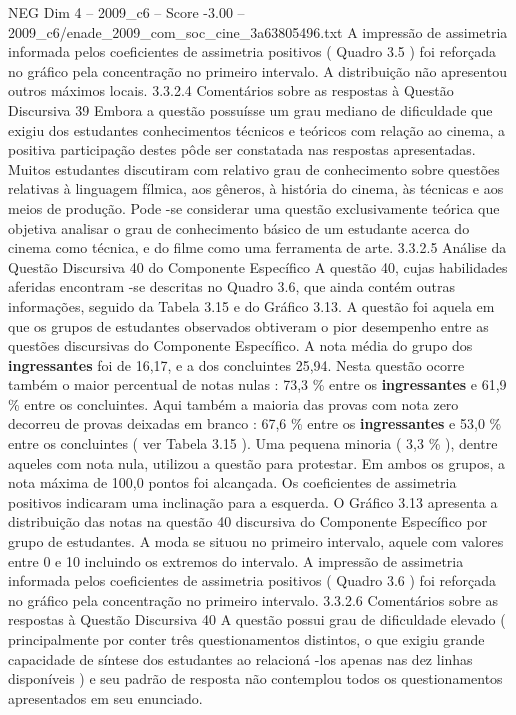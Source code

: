 \begin{textsample}{NEG Dim 4 – 2009\_c6 – Score -3.00 – 2009\_c6/enade\_2009\_com\_soc\_cine\_3a63805496.txt}
A impressão de assimetria informada pelos coeficientes de assimetria positivos ( Quadro 3.5 ) foi reforçada no gráfico pela concentração no primeiro intervalo.
A distribuição não apresentou outros máximos locais. 3.3.2.4 Comentários sobre as respostas à Questão Discursiva 39 Embora a questão possuísse um grau mediano de dificuldade que exigiu dos estudantes conhecimentos técnicos e teóricos com relação ao cinema, a positiva participação destes pôde ser constatada nas respostas apresentadas.
Muitos estudantes discutiram com relativo grau de conhecimento sobre questões relativas à linguagem fílmica, aos gêneros, à história do cinema, às técnicas e aos meios de produção.
Pode -se considerar uma questão exclusivamente teórica que objetiva analisar o grau de conhecimento básico de um estudante acerca do cinema como técnica, e do filme como uma ferramenta de arte. 3.3.2.5 Análise da Questão Discursiva 40 do Componente Específico A questão 40, cujas habilidades aferidas encontram -se descritas no Quadro 3.6, que ainda contém outras informações, seguido da Tabela 3.15 e do Gráfico 3.13.
A questão foi aquela em que os grupos de estudantes observados obtiveram o pior desempenho entre as questões discursivas do Componente Específico.
A nota média do grupo dos \textbf{ingressantes} foi de 16,17, e a dos concluintes 25,94.
Nesta questão ocorre também o maior percentual de notas nulas : 73,3 \% entre os \textbf{ingressantes} e 61,9 \% entre os concluintes.
Aqui também a maioria das provas com nota zero decorreu de provas deixadas em branco : 67,6 \% entre os \textbf{ingressantes} e 53,0 \% entre os concluintes ( ver Tabela 3.15 ).
Uma pequena minoria ( 3,3 \% ), dentre aqueles com nota nula, utilizou a questão para protestar.
Em ambos os grupos, a nota máxima de 100,0 pontos foi alcançada.
Os coeficientes de assimetria positivos indicaram uma inclinação para a esquerda.
O Gráfico 3.13 apresenta a distribuição das notas na questão 40 discursiva do Componente Específico por grupo de estudantes.
A moda se situou no primeiro intervalo, aquele com valores entre 0 e 10 incluindo os extremos do intervalo.
A impressão de assimetria informada pelos coeficientes de assimetria positivos ( Quadro 3.6 ) foi reforçada no gráfico pela concentração no primeiro intervalo. 3.3.2.6 Comentários sobre as respostas à Questão Discursiva 40 A questão possui grau de dificuldade elevado ( principalmente por conter três questionamentos distintos, o que exigiu grande capacidade de síntese dos estudantes ao relacioná -los apenas nas dez linhas disponíveis ) e seu padrão de resposta não contemplou todos os questionamentos apresentados em seu enunciado.

\end{textsample}
